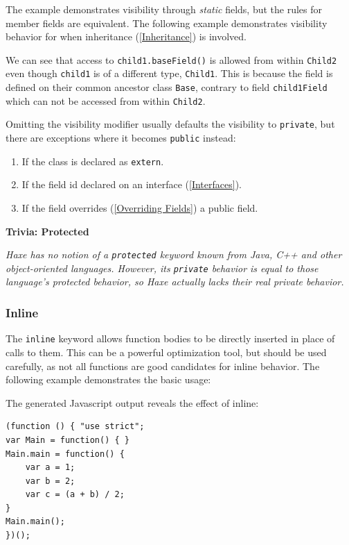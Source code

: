 \documentclass{article}
\newcommand{\target}[1]{#1}
\newcommand{\type}[1]{\texttt{#1}}
\newcommand{\expr}[1]{\texttt{#1}}
\newenvironment{myshaded}
  {\def\FrameCommand{\fboxsep=\topsep\colorbox{bgcolor}}%
  \MakeFramed {\advance\hsize-\width \FrameRestore}}%
 {\endMakeFramed}
\newcommand{\trivia}[2]
	{\begin{myshaded}\noindent\textbf{Trivia: #1}\par\nobreak\noindent\ignorespaces\textit{#2}\end{myshaded}}
\newcommand{\tref}[2]{#1 (\ref{#2})}
\newcommand{\haxe}[2][]{%
}
\begin{document}
The example demonstrates visibility through \emph{static} fields, but the rules for member fields are equivalent. The following example demonstrates visibility behavior for when \tref{inheritance}{Inheritance} is involved.

\haxe{assets/Visibility2.hx}

We can see that access to \expr{child1.baseField()} is allowed from within \type{Child2} even though \expr{child1} is of a different type, \type{Child1}. This is because the field is defined on their common ancestor class \type{Base}, contrary to field \expr{child1Field} which can not be accessed from within \type{Child2}.

Omitting the visibility modifier usually defaults the visibility to \expr{private}, but there are exceptions where it becomes \expr{public} instead:

\begin{enumerate}
	\item If the class is declared as \expr{extern}.
	\item If the field id declared on an \tref{interface}{Interfaces}.
	\item If the field \tref{overrides}{Overriding Fields} a public field.
\end{enumerate}

\trivia{Protected}{Haxe has no notion of a \expr{protected} keyword known from Java, C++ and other object-oriented languages. However, its \expr{private} behavior is equal to those language's protected behavior, so Haxe actually lacks their real private behavior.}

\subsubsection{Inline}
\label{Inline}

The \expr{inline} keyword allows function bodies to be directly inserted in place of calls to them. This can be a powerful optimization tool, but should be used carefully, as not all functions are good candidates for inline behavior. The following example demonstrates the basic usage:

\haxe{assets/Inline.hx}

The generated \target{Javascript} output reveals the effect of inline:

\begin{lstlisting}
(function () { "use strict";
var Main = function() { }
Main.main = function() {
	var a = 1;
	var b = 2;
	var c = (a + b) / 2;
}
Main.main();
})();
\end{lstlisting}
\end{document}
